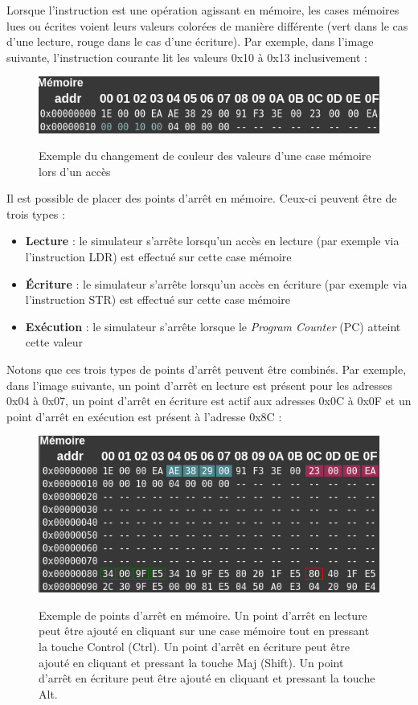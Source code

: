 \documentclass{tufte-handout}
\begin{document}
Lorsque l'instruction est une opération agissant en mémoire, les cases mémoires lues ou écrites voient leurs valeurs colorées de manière différente (vert dans le cas d'une lecture, rouge dans le cas d'une écriture). Par exemple, dans l'image suivante, l'instruction courante lit les valeurs 0x10 à 0x13 inclusivement :
\begin{figure}[h!]
\raggedleft
\includegraphics[width=0.8\linewidth]{pics/memoire_acces.png}
\label{f:memoireacces}
\caption{Exemple du changement de couleur des valeurs d'une case mémoire lors d'un accès}
\end{figure}

Il est possible de placer des points d'arrêt en mémoire. Ceux-ci peuvent être de trois types :
\begin{itemize}
	\item \textbf{Lecture} : le simulateur s'arrête lorsqu'un accès en lecture (par exemple via l'instruction LDR) est effectué sur cette case mémoire
	\item \textbf{Écriture} : le simulateur s'arrête lorsqu'un accès en écriture (par exemple via l'instruction STR) est effectué sur cette case mémoire
	\item \textbf{Exécution} : le simulateur s'arrête lorsque le \textit{Program Counter} (PC) atteint cette valeur
\end{itemize}
Notons que ces trois types de points d'arrêt peuvent être combinés. Par exemple, dans l'image suivante, un point d'arrêt en lecture est présent pour les adresses 0x04 à 0x07, un point d'arrêt en écriture est actif aux adresses 0x0C à 0x0F et un point d'arrêt en exécution est présent à l'adresse 0x8C :
\begin{figure}[h!]
\raggedleft
\includegraphics[width=0.8\linewidth]{pics/memoire_bkpt.png}
\label{f:memoirebkpt}
\caption{Exemple de points d'arrêt en mémoire. Un point d'arrêt en lecture peut être ajouté en cliquant sur une case mémoire tout en pressant la touche Control (Ctrl). Un point d'arrêt en écriture peut être ajouté en cliquant et pressant la touche Maj (Shift). Un point d'arrêt en écriture peut être ajouté en cliquant et pressant la touche Alt.}
\end{figure}
\end{document}
